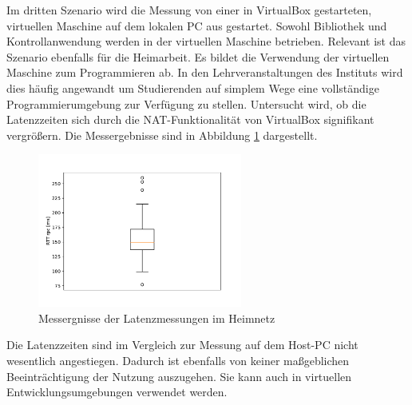 \documentclass[11pt,a4paper]{report}
\begin{document}
Im dritten Szenario wird die Messung von einer in VirtualBox gestarteten, virtuellen Maschine auf dem lokalen PC aus gestartet.
Sowohl Bibliothek und Kontrollanwendung werden in der virtuellen Maschine betrieben.
Relevant ist das Szenario ebenfalls für die Heimarbeit.
Es bildet die Verwendung der virtuellen Maschine zum Programmieren ab.
In den Lehrveranstaltungen des Instituts wird dies häufig angewandt um Studierenden auf simplem Wege eine vollständige Programmierumgebung zur Verfügung zu stellen. 
Untersucht wird, ob die Latenzzeiten sich durch die NAT-Funktionalität von VirtualBox signifikant vergrößern.
Die Messergebnisse sind in Abbildung \ref{fig:measure_vm} dargestellt.
\begin{figure}[htbp]
  \centering
  \includegraphics[width=0.6\textwidth]{images/timing_vm}
  \caption{Messergnisse der Latenzmessungen im Heimnetz}
  \label{fig:measure_vm}
\end{figure}
Die Latenzzeiten sind im Vergleich zur Messung auf dem Host-PC nicht wesentlich angestiegen.
Dadurch ist ebenfalls von keiner maßgeblichen Beeinträchtigung der Nutzung auszugehen.
Sie kann auch in virtuellen Entwicklungsumgebungen verwendet werden.
\end{document}
